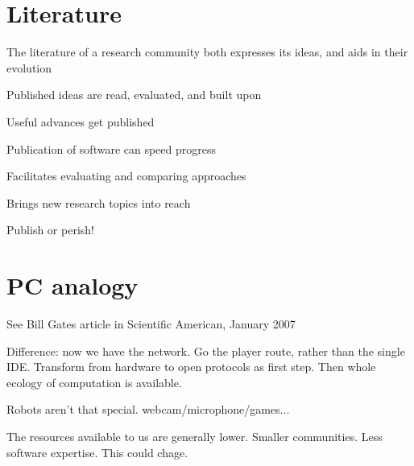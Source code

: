 \section{Literature}

The literature of a research community both expresses its ideas, and
aids in their evolution

Published ideas are read, evaluated, and built upon

Useful advances get published

Publication of software can speed progress

Facilitates evaluating and comparing approaches

Brings new research topics into reach

Publish or perish!


\section{PC analogy}

See Bill Gates article in Scientific American, January 2007

Difference: now we have the network.  Go the player route, rather than
the single IDE.  Transform from hardware to open protocols as first
step.  Then whole ecology of computation is available.

Robots aren't that special.  webcam/microphone/games...

The resources available to us are generally lower.  Smaller communities.
Less software expertise.  This could chage.


